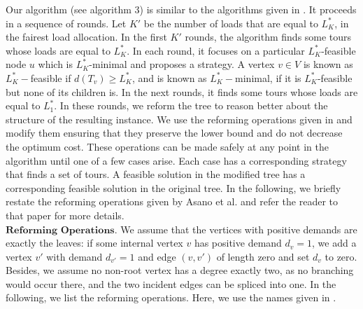 \indent Our algorithm (see algorithm 3) is similar to the algorithms given in \cite{Asano2001,Hamaguchi,Naoki}. It proceeds in a sequence of rounds. Let $K'$ be the number of loads that are equal to $L^*_K$, in the fairest load allocation. In the first $K'$ rounds, the algorithm finds some tours whose loads are equal to $L_K^*$. In each round, it focuses on a particular $L_K^*$-feasible node $u$ which is $L_K^*$-minimal and proposes a strategy. A vertex $v \in V$ is known as $L_K^*-$feasible if $d(T_v) \ge L_K^*$, and is known as $L_K^*-$minimal, if it is $L_K^*$-feasible but none of its children is. In the next rounds, it finds some tours whose loads are equal to $L_1^*$. In these rounds, we reform the tree to reason better about the structure of the resulting instance. We use the reforming operations given in \cite{Asano2001} and modify them ensuring that they preserve the lower bound and do not decrease the optimum cost. These operations can be made safely at any point in the algorithm until one of a few cases arise. Each case has a corresponding strategy that finds a set of tours. A feasible solution in the modified tree has a corresponding feasible solution in the original tree. In the following, we briefly restate the reforming operations given by Asano et al. \cite{Asano2001} and refer the reader to that paper for more details.\\
 \indent $\mathbf{Reforming \,\,Operations.}$ We assume that the vertices with positive demands are exactly the leaves: if some internal vertex $v$ has positive demand $d_v=1$, we add a vertex $v'$ with demand $d_{v'}=1$ and edge $(v,v')$ of length zero and set $d_v$ to zero. Besides, we assume no non-root vertex has a degree exactly two, as no branching would occur there, and the two incident edges can be spliced into one. In the following, we list the reforming operations. Here, we use the names given in \cite{Becker}. 
